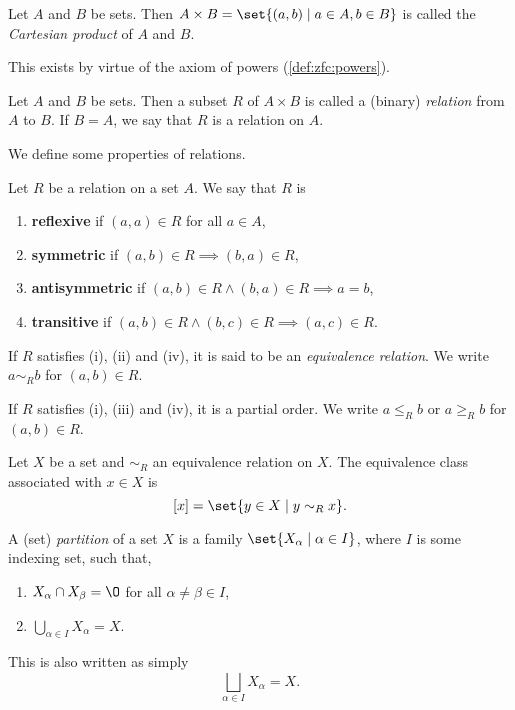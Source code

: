 
\begin{definition} \label{def:cartesian_product}
    Let $A$ and $B$ be sets.
    Then $A \times B = \set{(a, b) \mid a \in A, b \in B}$ is called the
    \emph{Cartesian product} of $A$ and $B$. 
\end{definition}
This exists by virtue of the axiom of powers (\ref{def:zfc:powers}).
\begin{definition}[Relation] \label{def:relation}
    Let $A$ and $B$ be sets.
    Then a subset $R$ of $A \times B$ is called a (binary) \emph{relation}
    from $A$ to $B$.
    If $B = A$, we say that $R$ is a relation on $A$.
\end{definition}

We define some properties of relations.
\begin{definition}
    Let $R$ be a relation on a set $A$.
    We say that $R$ is
    \begin{enumerate}
        \item \textbf{reflexive} if $(a, a) \in R$ for all $a \in A$,
        \item \textbf{symmetric} if $(a, b) \in R \implies (b, a) \in R$,
        \item \textbf{antisymmetric} if $(a, b) \in R \land (b, a) \in R
        \implies a = b$,
        \item \textbf{transitive} if $(a, b) \in R \land (b, c) \in R
        \implies (a, c) \in R$.
    \end{enumerate}
    If $R$ satisfies (i), (ii) and (iv), it is said to be an
    \emph{equivalence relation}.
    We write $a \sim_R b$ for $(a, b) \in R$.

    If $R$ satisfies (i), (iii) and (iv), it is a partial order.
    We write $a \le_R b$ or $a \ge_R b$ for $(a, b) \in R$.
\end{definition}

\begin{definition} \label{def:equivalence_class}
    Let $X$ be a set and $\sim_R$ an equivalence relation on $X$.
    The equivalence class associated with $x \in X$ is \[
        [x] = \set{y \in X \mid y \sim_R x}.
    \]
\end{definition}

\begin{definition}[Partition] \label{def:partition}
    A (set) \emph{partition} of a set $X$ is a family $\set{X_\alpha \mid
    \alpha \in I}$, where $I$ is some indexing set, such that,
    \begin{enumerate}
        \item $X_\alpha \cap X_\beta = \O$ for all $\alpha \ne \beta \in I$,
        \item $\bigcup_{\alpha \in I} X_\alpha = X$.
    \end{enumerate}
    This is also written as simply \[
        \bigsqcup_{\alpha \in I} X_\alpha = X.
    \]
\end{definition}


